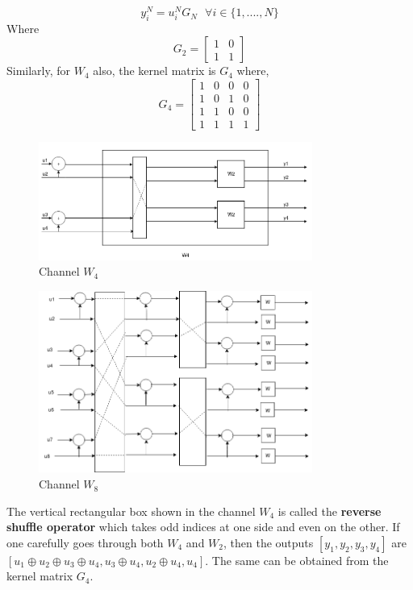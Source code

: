 \documentclass{article}
\begin{document}
\begin{equation}
y_{i}^{N} = u_{i}^{N}G_{N} \textrm{ }\forall i \in \{1, ...., N\}
\end{equation}
Where
\[G_{2} = 
\begin{bmatrix}
1 & 0 \\
1 & 1
\end{bmatrix}
\]
Similarly, for $W_{4}$ also, the kernel matrix is $G_{4}$ where, 
\[G_{4} = 
\begin{bmatrix}
1 & 0 & 0 & 0 \\
1 & 0 & 1 & 0 \\
1 & 1 & 0 & 0 \\
1 & 1 & 1 & 1
\end{bmatrix}
\]
\begin{figure}[H]
\centering
\includegraphics[width=0.8\textwidth, height=0.2\textheight]{w4.png}
\caption{Channel $W_{4}$}
\end{figure}
\begin{figure}[H]
\centering
\includegraphics[width=0.8\textwidth, height=0.5\textheight]{w8.png}
\caption{Channel $W_{8}$}
\end{figure}
The vertical rectangular box shown in the channel $W_{4}$ is called the \textbf{reverse shuffle operator} which takes odd indices at one side and even on the other. If one carefully goes through both $W_{4}$ and $W_{2}$, then the outputs $[y_{1}, y_{2},y_{3},y_{4}]$ are $[u_{1}\oplus u_{2} \oplus u_{3} \oplus u_{4}, u_{3} \oplus u_{4}, u_{2} \oplus u_{4}, u_{4}]$. The same can be obtained from the kernel matrix $G_{4}$.
\end{document}

